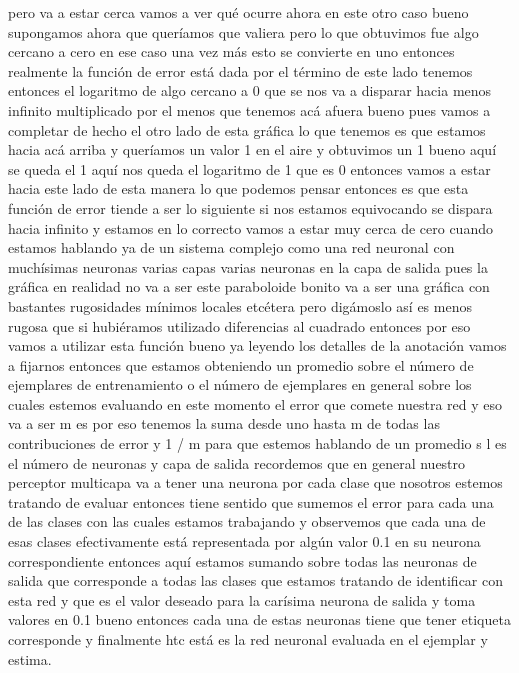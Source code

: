 pero va a estar cerca vamos a ver qué ocurre ahora en este otro caso bueno supongamos ahora que queríamos que valiera pero lo que obtuvimos fue algo cercano a cero en ese caso una vez más esto se convierte en uno entonces realmente la función de error está dada por el término de este lado tenemos entonces el logaritmo de algo cercano a 0 que se nos va a disparar hacia menos infinito multiplicado por el menos que tenemos acá afuera bueno pues vamos a completar de hecho el otro lado de esta gráfica lo que tenemos es que estamos hacia acá arriba y queríamos un valor 1 en el aire y obtuvimos un 1 bueno aquí se queda el 1 aquí nos queda el logaritmo de 1 que es 0 entonces vamos a estar hacia este lado de esta manera lo que podemos pensar entonces es que esta función de error tiende a ser lo siguiente si nos estamos equivocando se dispara hacia infinito y estamos en lo correcto vamos a estar muy cerca de cero cuando estamos hablando ya de un sistema complejo como una red neuronal con muchísimas neuronas varias capas varias neuronas en la capa de salida pues la gráfica en realidad no va a ser este paraboloide bonito va a ser una gráfica con bastantes rugosidades mínimos locales etcétera pero digámoslo así es menos rugosa que si hubiéramos utilizado diferencias al cuadrado entonces por eso vamos a utilizar esta función bueno ya leyendo los detalles de la anotación vamos a fijarnos entonces que estamos obteniendo un promedio sobre el número de ejemplares de entrenamiento o el número de ejemplares en general sobre los cuales estemos evaluando en este momento el error que comete nuestra red y eso va a ser m es por eso tenemos la suma desde uno hasta m de todas las contribuciones de error y 1 / m para que estemos hablando de un promedio s l es el número de neuronas y capa de salida recordemos que en general nuestro perceptor multicapa va a tener una neurona por cada clase que nosotros estemos tratando de evaluar entonces tiene sentido que sumemos el error para cada una de las clases con las cuales estamos trabajando y observemos que cada una de esas clases efectivamente está representada por algún valor 0.1 en su neurona correspondiente entonces aquí estamos sumando sobre todas las neuronas de salida que corresponde a todas las clases que estamos tratando de identificar con esta red y que es el valor deseado para la carísima neurona de salida y toma valores en 0.1 bueno entonces cada una de estas neuronas tiene que tener etiqueta corresponde y finalmente htc está es la red neuronal evaluada en el ejemplar y estima.

